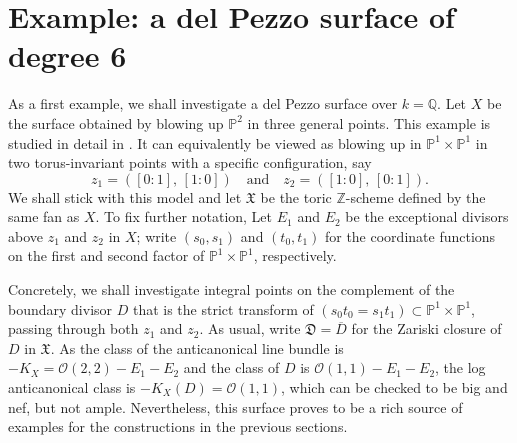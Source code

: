 \documentclass[a4paper, twoside, 11pt]{amsart}
\theoremstyle{definition}
\newcommand{\cO}{\mathcal{O}}
\newcommand{\mD}{\mathfrak{D}}
\newcommand{\mX}{\mathfrak{X}}
\newcommand{\PP}{\mathbb{P}}
\newcommand{\QQ}{\mathbb{Q}}
\newcommand{\ZZ}{\mathbb{Z}}
\begin{document}
	\section{Example: a del Pezzo surface of degree 6}\label{se:ex}	
    As a first example, we shall investigate a del Pezzo surface over $k=\QQ$.    
	Let $X$ be the surface obtained by blowing up $\PP^2$ in three general points. This example is studied in detail in \cite{HuangIJNT}. It can equivalently be viewed as blowing up in $\PP^1\times\PP^1$ in two torus-invariant points with a specific configuration, say
	\begin{equation*}
		z_1=([0:1],\,[1:0])\quad\text{and}\quad z_2=([1:0],\,[0:1]).
	\end{equation*}
	We shall stick with this model and let $\mX$ be the toric $\ZZ$-scheme defined by the same fan as $X$. To fix further notation, Let $E_1$ and $E_2$ be the exceptional divisors above $z_1$ and $z_2$ in $X$; write $(s_0,s_1)$ and $(t_0,t_1)$ for the coordinate functions on the first and second factor of $\PP^1\times \PP^1$, respectively.
	
    Concretely, we shall investigate integral points on the complement of the boundary divisor $D$ that is the strict transform of $(s_0t_0=s_1t_1)\subset\PP^1\times\PP^1$, passing through both $z_1$ and $z_2$. As usual, write $\mD = \overline{D}$ for the Zariski closure of $D$ in $\mX$. As the class of the anticanonical line bundle is $-K_{X}=\cO(2,2)-E_1-E_2$ and the class of $D$ is $\cO(1,1)-E_1-E_2$, the log anticanonical class is $-K_X(D) = \cO(1,1)$, which can be checked to be big and nef, but not ample. Nevertheless, this surface proves to be a rich source of examples for the constructions in the previous sections. 
    
\end{document}
